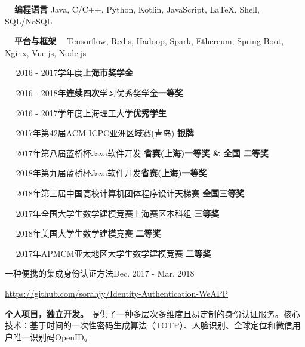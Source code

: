 \documentclass{sorahjy_cv}
\begin{document}
%
%

\begin{description}{}
	\item{\textbf{\ \ 编程语言 \quad }} Java, C/C++, Python, Kotlin, JavaScript, \LaTeX, Shell, SQL/NoSQL
	\item{\textbf{\ \ 平台与框架 \ }} Tensorflow, Redis, Hadoop, Spark, Ethereum, Spring Boot, Nginx, Vue.js, Node.js 
\end{description}


%
%

\begin{description}{}
	\item{\ \ } 2016 - 2017学年度\textbf{上海市奖学金}
	\item{\ \ } 2016 - 2018年\textbf{连续四次}学习优秀奖学金\textbf{一等奖}
	\item{\ \ } 2016 - 2017学年度上海理工大学\textbf{优秀学生}
	\item{\ \ } 2017年第42届ACM-ICPC亚洲区域赛(青岛) \hfill \textbf{银牌}
	\item{\ \ } 2017年第八届蓝桥杯Java软件开发 \hfill \textbf{省赛(上海)一等奖 \& 全国 二等奖}
	\item{\ \ } 2018年第九届蓝桥杯Java软件开发\hfill \textbf{省赛(上海)一等奖}
	\item{\ \ } 2018年第三届中国高校计算机团体程序设计天梯赛 \hfill \textbf{全国三等奖}
	\item{\ \ } 2017年全国大学生数学建模竞赛上海赛区本科组 \hfill \textbf{三等奖}
	\item{\ \ } 2018年美国大学生数学建模竞赛 \hfill \textbf{二等奖}
	\item{\ \ } 2017年APMCM亚太地区大学生数学建模竞赛 \hfill \textbf{二等奖}

\end{description}


%
%


\begin{sectionContentSimple}{一种便携的集成身份认证方法}{Dec. 2017 - Mar. 2018}
	\item \url{https://github.com/sorahjy/Identity-Authentication-WeAPP}
	\item \textbf{个人项目，独立开发。} 提供了一种多层次多维度且易定制的身份认证服务。核心技术：基于时间的一次性密码生成算法（TOTP）、人脸识别、全球定位和微信用户唯一识别码OpenID。
\end{sectionContentSimple}
\end{document}
